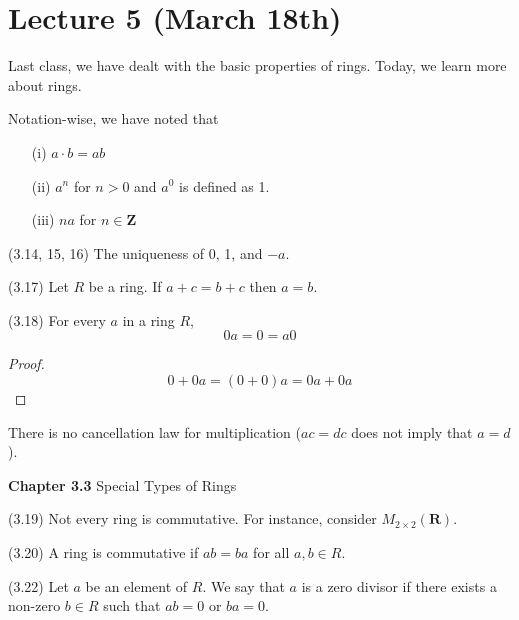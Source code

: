 \section{Lecture 5 (March 18th)}
Last class, we have dealt with the basic properties of rings. Today, we learn more about rings.\\
\begin{recall}
Notation-wise, we have noted that
\begin{itemize}
	\item[(i)] $a\cdot b=ab$
	\item[(ii)] $a^{n}$ for $n>0$ and $a^{0}$ is defined as 1.
	\item[(iii)] $n a$ for $n\in {\bm Z}$
\end{itemize}
\end{recall}
\vspace{2ex}
\begin{prop}
 (3.14, 15, 16) The uniqueness of 0, 1, and $-a$. 
\end{prop}
\vspace{2ex}
\begin{prop}
 (3.17) Let $R$ be a ring. If $a+c=b+c$ then $a=b$.
\end{prop}
\vspace{2ex}
\begin{cor}
 (3.18) For every $a$ in a ring $R$,
 \[0a=0=a0\] 
\end{cor}
\vspace{2ex}
\begin{proof}
\[0+0a=(0+0)a=0a+0a\]
\end{proof}
\vspace{2ex}
\begin{rmk}
There is no cancellation law for multiplication ($ac=dc$ does not imply that $a=d$). 
\end{rmk}
\vspace{2ex}
{\bf Chapter 3.3}\hspace{2ex} Special Types of Rings
\\
\begin{ex}
 (3.19) Not every ring is commutative. For instance, consider $M_{2\times 2}({\bm R})$. 
\end{ex}
\vspace{2ex}
\begin{defi}
 (3.20) A ring is commutative if $ab=ba$ for all $a,b\in R$.  
\end{defi}
\vspace{2ex}
\begin{defi}
 (3.22) Let $a$ be an element of $R$. We say that $a$ is a zero divisor if there exists a non-zero $b\in R$ such that $ab=0$ or $ba=0$. 
\end{defi}
